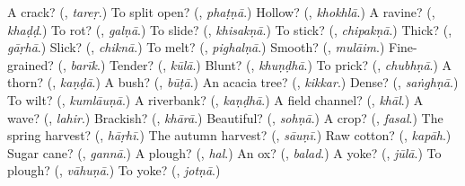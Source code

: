 \begin{tcolorbox}[breakable,colback=teal!4,colframe=teal!35!black,title={Before you move on}]
A crack? (\textbf{}, \emph{tareṛ}.) To split open? (\textbf{}, \emph{phaṭṇā}.) Hollow? (\textbf{}, \emph{khokhlā}.) A ravine? (\textbf{}, \emph{khaḍḍ}.) To rot? (\textbf{}, \emph{galṇā}.) To slide? (\textbf{}, \emph{khisakṇā}.) To stick? (\textbf{}, \emph{chipakṇā}.) Thick? (\textbf{}, \emph{gāṛhā}.) Slick? (\textbf{}, \emph{chiknā}.) To melt? (\textbf{}, \emph{pighalṇā}.) Smooth? (\textbf{}, \emph{mulāim}.) Fine-grained? (\textbf{}, \emph{barīk}.) Tender? (\textbf{}, \emph{kūlā}.) Blunt? (\textbf{}, \emph{khuṇḍhā}.) To prick? (\textbf{}, \emph{chubhṇā}.) A thorn? (\textbf{}, \emph{kaṇḍā}.) A bush? (\textbf{}, \emph{būṭā}.) An acacia tree? (\textbf{}, \emph{kikkar}.) Dense? (\textbf{}, \emph{saṅghṇā}.) To wilt? (\textbf{}, \emph{kumlāuṇā}.) A riverbank? (\textbf{}, \emph{kaṇḍhā}.) A field channel? (\textbf{}, \emph{khāl}.) A wave? (\textbf{}, \emph{lahir}.) Brackish? (\textbf{}, \emph{khārā}.) Beautiful? (\textbf{}, \emph{sohṇā}.) A crop? (\textbf{}, \emph{fasal}.) The spring harvest? (\textbf{}, \emph{hāṛhī}.) The autumn harvest? (\textbf{}, \emph{sāuṇī}.) Raw cotton? (\textbf{}, \emph{kapāh}.) Sugar cane? (\textbf{}, \emph{gannā}.) A plough? (\textbf{}, \emph{hal}.) An ox? (\textbf{}, \emph{balad}.) A yoke? (\textbf{}, \emph{jūlā}.) To plough? (\textbf{}, \emph{vāhuṇā}.) To yoke? (\textbf{}, \emph{jotṇā}.)
\end{tcolorbox}
